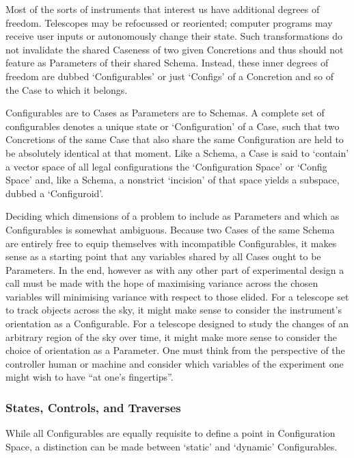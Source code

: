 \documentclass[letterpaper,10pt,english]{jupyterBook}
\begin{document}
\sphinxAtStartPar
Most of the sorts of instruments that interest us have additional degrees of freedom. Telescopes may be refocussed or reoriented; computer programs may receive user inputs or autonomously change their state. Such transformations do not invalidate the shared Case\sphinxhyphen{}ness of two given Concretions and thus should not feature as Parameters of their shared Schema. Instead, these inner degrees of freedom are dubbed ‘Configurables’ or just ‘Configs’ of a Concretion \sphinxhyphen{} and so of the Case to which it belongs.

\sphinxAtStartPar
Configurables are to Cases as Parameters are to Schemas. A complete set of configurables denotes a unique state or ‘Configuration’ of a Case, such that two Concretions of the same Case that also share the same Configuration are held to be absolutely identical at that moment. Like a Schema, a Case is said to ‘contain’ a vector space of all legal configurations \sphinxhyphen{} the ‘Configuration Space’ or ‘Config Space’ \sphinxhyphen{} and, like a Schema, a non\sphinxhyphen{}strict ‘incision’ of that space yields a subspace, dubbed a ‘Configuroid’.

\sphinxAtStartPar
Deciding which dimensions of a problem to include as Parameters and which as Configurables is somewhat ambiguous. Because two Cases of the same Schema are entirely free to equip themselves with incompatible Configurables, it makes sense as a starting point that any variables shared by all Cases ought to be Parameters. In the end, however \sphinxhyphen{} as with any other part of experimental design \sphinxhyphen{} a call must be made with the hope of maximising variance across the chosen variables will minimising variance with respect to those elided. For a telescope set to track objects across the sky, it might make sense to consider the instrument’s orientation as a Configurable. For a telescope designed to study the changes of an arbitrary region of the sky over time, it might make more sense to consider the choice of orientation as a Parameter. One must think from the perspective of the controller \sphinxhyphen{} human or machine \sphinxhyphen{} and consider which variables of the experiment one might wish to have “at one’s fingertips”.


\subsubsection{States, Controls, and Traverses}
\label{\detokenize{content/chapter_03_everest/doctrine:states-controls-and-traverses}}
\sphinxAtStartPar
While all Configurables are equally requisite to define a point in Configuration Space, a distinction can be made between ‘static’ and ‘dynamic’ Configurables.
\end{document}
